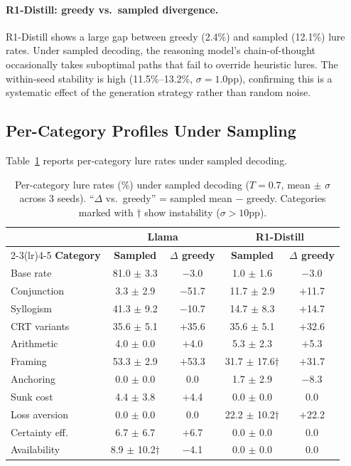 \documentclass{article}
\begin{document}
\paragraph{R1-Distill: greedy vs.\ sampled divergence.}
R1-Distill shows a large gap between greedy (2.4\%) and sampled
(12.1\%) lure rates.  Under sampled decoding, the reasoning model's
chain-of-thought occasionally takes suboptimal paths that fail to
override heuristic lures.  The within-seed stability is high
(11.5\%--13.2\%, $\sigma = 1.0$pp), confirming this is a systematic
effect of the generation strategy rather than random noise.

\subsection{Per-Category Profiles Under Sampling}

Table~\ref{tab:robustness_percategory} reports per-category lure
rates under sampled decoding.

\begin{table}[ht]
\centering
\caption{Per-category lure rates (\%) under sampled decoding
  ($T = 0.7$, mean $\pm$ $\sigma$ across 3 seeds).
  ``$\Delta$ vs.\ greedy'' = sampled mean $-$ greedy.
  Categories marked with $\dagger$ show instability
  ($\sigma > 10$pp).}
\label{tab:robustness_percategory}
\vspace{4pt}
\small
\begin{tabular}{lcccc}
\toprule
& \multicolumn{2}{c}{\textbf{Llama}} & \multicolumn{2}{c}{\textbf{R1-Distill}} \\
\cmidrule(lr){2-3}\cmidrule(lr){4-5}
\textbf{Category} & \textbf{Sampled} & \textbf{$\Delta$ greedy} & \textbf{Sampled} & \textbf{$\Delta$ greedy} \\
\midrule
Base rate      & 81.0 $\pm$ 3.3 & $-$3.0  & 1.0 $\pm$ 1.6    & $-$3.0 \\
Conjunction    & 3.3 $\pm$ 2.9  & $-$51.7 & 11.7 $\pm$ 2.9   & $+$11.7 \\
Syllogism      & 41.3 $\pm$ 9.2 & $-$10.7 & 14.7 $\pm$ 8.3   & $+$14.7 \\
CRT variants   & 35.6 $\pm$ 5.1 & $+$35.6 & 35.6 $\pm$ 5.1   & $+$32.6 \\
Arithmetic     & 4.0 $\pm$ 0.0  & $+$4.0  & 5.3 $\pm$ 2.3    & $+$5.3 \\
Framing        & 53.3 $\pm$ 2.9 & $+$53.3 & 31.7 $\pm$ 17.6$\dagger$ & $+$31.7 \\
Anchoring      & 0.0 $\pm$ 0.0  & 0.0     & 1.7 $\pm$ 2.9    & $-$8.3 \\
Sunk cost      & 4.4 $\pm$ 3.8  & $+$4.4  & 0.0 $\pm$ 0.0    & 0.0 \\
Loss aversion  & 0.0 $\pm$ 0.0  & 0.0     & 22.2 $\pm$ 10.2$\dagger$ & $+$22.2 \\
Certainty eff. & 6.7 $\pm$ 6.7  & $+$6.7  & 0.0 $\pm$ 0.0    & 0.0 \\
Availability   & 8.9 $\pm$ 10.2$\dagger$ & $-$4.1 & 0.0 $\pm$ 0.0 & 0.0 \\
\bottomrule
\end{tabular}
\end{table}
\end{document}

